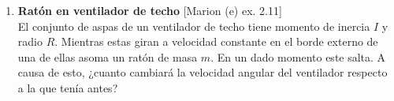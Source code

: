 \documentclass[11pt, spanish, a4paper, twoside]{article}
\begin{document}
\begin{enumerate}
\item \textbf{Ratón en ventilador de techo} [Marion (e) ex. 2.11]\\
El conjunto de aspas de un ventilador de techo tiene momento de inercia \(I\) y radio \(R\).
Mientras estas giran a velocidad constante en el borde externo de una de ellas asoma un ratón de masa \(m\).
En un dado momento este salta.
A causa de esto, ¿cuanto cambiará la velocidad angular del ventilador respecto a la que tenía antes?










\end{enumerate}
\end{document}
